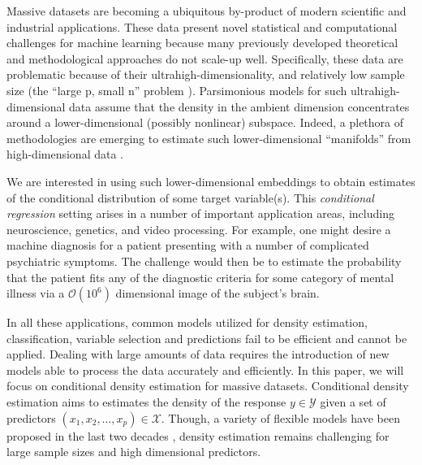 \documentclass{article}
\newcommand{\jovo}[1]{{\color{magenta}{\it JoVo says: #1}}}
\begin{document}
Massive datasets are becoming a ubiquitous by-product of modern scientific and industrial applications. These data present novel statistical and computational challenges for machine learning because many previously developed theoretical and methodological approaches do not scale-up well.  Specifically, these data are problematic because of their ultrahigh-dimensionality, and relatively low sample size (the ``large p, small n'' problem \cite{West}).
Parsimonious models for such ultrahigh-dimensional data assume that the density in the ambient dimension concentrates around a lower-dimensional (possibly nonlinear) subspace.  Indeed, a plethora of methodologies are emerging to estimate such lower-dimensional ``manifolds'' from high-dimensional data \cite{Manifold, Maggioni}.  

We are interested in using such lower-dimensional embeddings to obtain estimates of the conditional distribution of some target variable(s).  This \emph{conditional regression} setting arises in a number of important application areas, including neuroscience, genetics, and video processing.  For example, one might desire a machine diagnosis for a patient presenting with a number of complicated psychiatric symptoms.   The challenge would then be to estimate the probability that the patient fits any of the diagnostic criteria for some category of mental illness via a $\mathcal{O}(10^6)$ dimensional image of the subject's brain. 


In all these applications, common models utilized for density estimation, classification, variable selection and predictions fail to be efficient and cannot be applied. 
Dealing with large amounts of data requires the introduction of new models able to process the data accurately and efficiently. 
In this paper, we will focus on conditional density estimation for massive datasets. Conditional density estimation aims to estimates the density of the response $y \in \mathcal{Y}$ given a set of predictors $(x_1, x_2, \ldots, x_p)\in \mathcal{X}$. Though, a variety of flexible models have been proposed in the last two decades \cite{DDP, DunsonPark}, density estimation remains challenging for large sample sizes and high dimensional predictors. 

\jovo{these algorithms are not really the right comparisons to make, because none of them scale up well.  for dealing with massive dimensional predictors, we want to compare with vowpal wabbit, liblinear, as well as PCA on the data followed by SVM.  we also want to compare to other conditional regression models, which don't scale up.}
\end{document}
